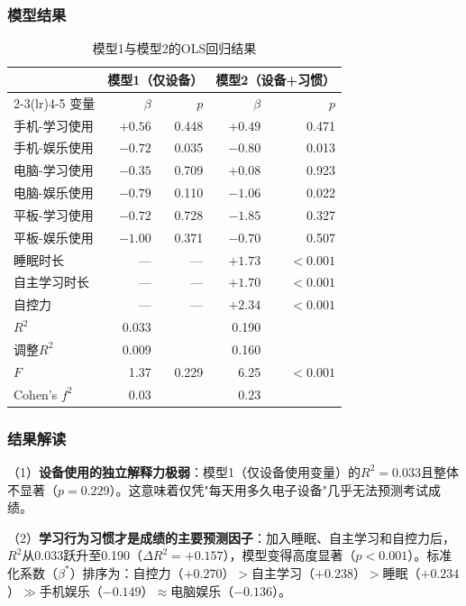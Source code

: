 \documentclass[11pt]{ctexart}
\begin{document}
\subsubsection{模型结果}

\begin{table}[H]
\centering
\caption{模型1与模型2的OLS回归结果}
\label{tab:ols}
\begin{tabular}{lrrrr}
\toprule
 & \multicolumn{2}{c}{模型1（仅设备）} & \multicolumn{2}{c}{模型2（设备+习惯）} \\
\cmidrule(lr){2-3}\cmidrule(lr){4-5}
变量 & $\beta$ & $p$ & $\beta$ & $p$ \\
\midrule
手机-学习使用 & $+0.56$ & 0.448 & $+0.49$ & 0.471 \\
手机-娱乐使用 & $-0.72$ & 0.035 & $\mathbf{-0.80}$ & 0.013 \\
电脑-学习使用 & $-0.35$ & 0.709 & $+0.08$ & 0.923 \\
电脑-娱乐使用 & $-0.79$ & 0.110 & $\mathbf{-1.06}$ & 0.022 \\
平板-学习使用 & $-0.72$ & 0.728 & $-1.85$ & 0.327 \\
平板-娱乐使用 & $-1.00$ & 0.371 & $-0.70$ & 0.507 \\
睡眠时长 & — & — & $\mathbf{+1.73}$ & $<0.001$ \\
自主学习时长 & — & — & $\mathbf{+1.70}$ & $<0.001$ \\
自控力 & — & — & $\mathbf{+2.34}$ & $<0.001$ \\
\midrule
$R^2$ & 0.033 & & 0.190 & \\
调整$R^2$ & 0.009 & & 0.160 & \\
$F$ & 1.37 & 0.229 & 6.25 & $<0.001$ \\
Cohen's $f^2$ & 0.03 & & 0.23 & \\
\bottomrule
\end{tabular}
\end{table}

\subsubsection{结果解读}

（1）\textbf{设备使用的独立解释力极弱}：模型1（仅设备使用变量）的$R^2=0.033$且整体不显著（$p=0.229$）。这意味着仅凭"每天用多久电子设备"几乎无法预测考试成绩。

（2）\textbf{学习行为习惯才是成绩的主要预测因子}：加入睡眠、自主学习和自控力后，$R^2$从0.033跃升至0.190（$\Delta R^2=+0.157$），模型变得高度显著（$p<0.001$）。标准化系数（$\beta^*$）排序为：自控力（$+0.270$）$>$自主学习（$+0.238$）$>$睡眠（$+0.234$）$\gg$手机娱乐（$-0.149$）$\approx$电脑娱乐（$-0.136$）。
\end{document}
